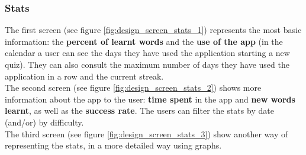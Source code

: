 \subsubsection{Stats}
The first screen (see figure \ref{fig:design_screen_stats_1}) represents the most basic information: the \textbf{percent of learnt words} and the \textbf{use of the app} (in the calendar a user can see the days they have used the application starting a new quiz). They can also consult the maximum number of days they have used the application in a row and the current streak. \\

The second screen (see figure \ref{fig:design_screen_stats_2}) shows more information about the app to the user: \textbf{time spent} in the app and \textbf{new words learnt}, as well as the \textbf{success rate}. The users can filter the stats by date (and/or) by difficulty. \\

The third screen (see figure \ref{fig:design_screen_stats_3}) show another way of representing the stats, in a more detailed way using graphs. \\

